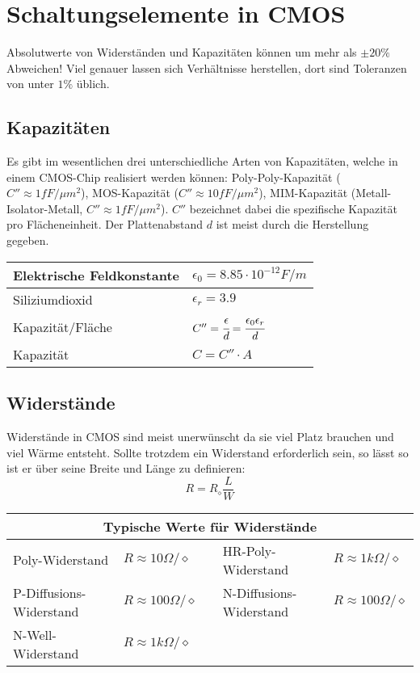 \section{Schaltungselemente in CMOS}
Absolutwerte von Widerständen und Kapazitäten können um mehr als $\pm 20\%$ Abweichen! Viel genauer lassen sich Verhältnisse herstellen, dort sind Toleranzen von
unter $1\%$ üblich.

\subsection{Kapazitäten}
Es gibt im wesentlichen drei unterschiedliche Arten von Kapazitäten, welche in einem CMOS-Chip realisiert werden können: 
Poly-Poly-Kapazität ($C'' \approx 1fF/\mu m^2$),
MOS-Kapazität ($C'' \approx 10fF/\mu m^2$),
MIM-Kapazität (Metall-Isolator-Metall, $C'' \approx 1fF/\mu m^2$). $C''$ bezeichnet dabei die spezifische Kapazität pro Flächeneinheit.
Der Plattenabstand $d$ ist meist durch die Herstellung gegeben.

\begin{tabularx}{\linewidth}{|l|X|}
	\hline
	Elektrische Feldkonstante	& $\epsilon_0 = 8.85 \cdot 10^{-12} F/m$
	\\ \hline
	Siliziumdioxid & $\epsilon_r = 3.9$
	\\ \hline
	Kapazität/Fläche	& $C'' = \cfrac{\epsilon}{d} = \cfrac{\epsilon_0 \epsilon_r}{d}$
	\\ \hline
	Kapazität & $C = C'' \cdot A$
	\\ \hline
\end{tabularx}

\subsection{Widerstände}
Widerstände in CMOS sind meist unerwünscht da sie viel Platz brauchen und viel Wärme entsteht. Sollte trotzdem ein
Widerstand erforderlich sein, so lässt so ist er über seine Breite und Länge zu definieren:
\[
	R = R_\diamond \frac{L}{W}
\]

\begin{tabularx}{0.8\linewidth}{|l|l|X|l|l|}
	\hline
	\multicolumn{5}{|c|}{\textbf{Typische Werte für Widerstände}}
	\\ \hline
	Poly-Widerstand & $R \approx 10 \Omega/\diamond$ & & HR-Poly-Widerstand & $R \approx 1k\Omega/\diamond$
	\\ \hline
	P-Diffusions-Widerstand & $R \approx 100\Omega/\diamond$ & & N-Diffusions-Widerstand & $R \approx 100\Omega/\diamond$
	\\ \hline
	N-Well-Widerstand & $R \approx 1k\Omega/\diamond$ & & &
	\\ \hline
\end{tabularx}